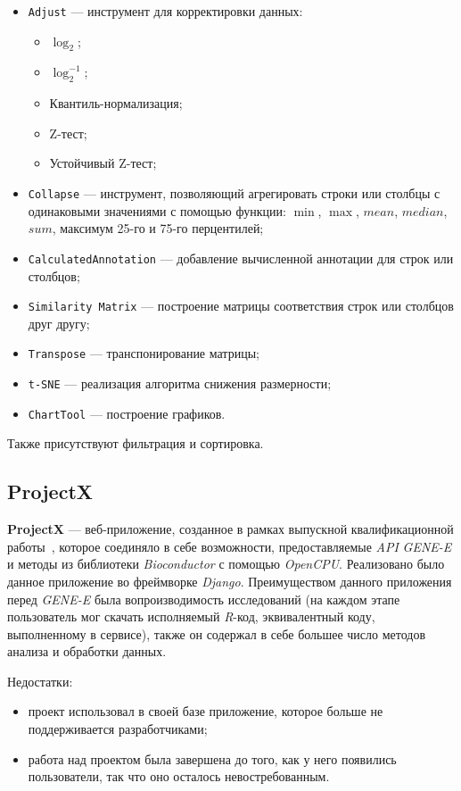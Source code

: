 \begin{itemize}
\item \texttt{Adjust} --- инструмент для корректировки данных:\begin{itemize}
    \item $\log_{2}$;
    \item $\log_{2}^{-1}$;
    \item Квантиль-нормализация;
    \item Z-тест;
    \item Устойчивый Z-тест;\end{itemize}
\item \texttt{Collapse} --- инструмент, позволяющий агрегировать строки или столбцы с одинаковыми значениями с помощью функции: $\min$, $\max$, $mean$, $median$, $sum$, максимум 25-го и 75-го перцентилей;
\item \texttt{CalculatedAnnotation} --- добавление вычисленной аннотации для строк или столбцов;
\item \texttt{Similarity Matrix} --- построение матрицы соответствия строк или столбцов друг другу;
\item \texttt{Transpose} --- транспонирование матрицы;
\item \texttt{t-SNE} --- реализация алгоритма снижения размерности;
\item \texttt{ChartTool} --- построение графиков.
\end{itemize}

Также присутствуют фильтрация и сортировка.

\subsection{ProjectX}
\textbf{ProjectX} --- веб-приложение, созданное в рамках выпускной квалификационной работы~\cite{projectx}, которое соединяло в себе возможности, предоставляемые \emph{API} \emph{GENE-E} и методы из библиотеки \emph{Bioconductor} с помощью \emph{OpenCPU}. Реализовано было данное приложение во фреймворке \emph{Django}. Преимуществом данного приложения перед \emph{GENE-E} была вопроизводимость исследований (на каждом этапе пользователь мог скачать исполняемый \emph{R}-код, эквивалентный коду, выполненному в сервисе), также он содержал в себе большее число методов анализа и обработки данных.

Недостатки:
\begin{itemize}
\item проект использовал в своей базе приложение, которое больше не поддерживается разработчиками;
\item работа над проектом была завершена до того, как у него появились пользователи, так что оно осталось невостребованным.
\end{itemize}


